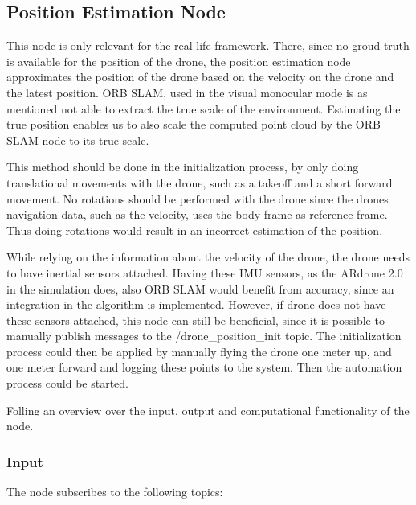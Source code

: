 	
	\subsection{Position Estimation Node}
	
	This node is only relevant for the real life framework. There, since no groud truth is available for the position of the drone, 
	the position estimation node approximates the position of the drone based on the velocity on the drone and the latest position. ORB SLAM, used 
	in the visual monocular mode is as mentioned not able to extract the true scale of the environment. Estimating the true position enables us 
	to also scale the computed point cloud by the ORB SLAM node to its true scale. 
	
	This method should be done in the initialization process, by 
	only doing translational movements with the drone, such as a takeoff and a short forward movement. No rotations should be performed with the drone 
	since the drones navigation data, such as the velocity, uses the body-frame as reference frame. Thus doing rotations would result in an incorrect 
	estimation of the position. 
	
	While relying on the information about the 
	velocity of the drone, the drone needs to have inertial sensors attached. Having these IMU sensors, as the ARdrone 2.0 in the simulation does,
	also ORB SLAM would benefit from 
	accuracy, since an integration in the algorithm is implemented. However, if drone does not have these sensors attached, 
	this node can still be beneficial, since it is possible to manually publish messages to the /drone\_position\_init topic. 
	The initialization process could then be applied 
	by manually flying the drone one meter up, and one meter forward and logging these points to the system. Then the automation process could be started.
	
	
	Folling an overview over the input, output and computational functionality of the node. 
	
	\subsubsection{Input}
	
	The node subscribes to the following topics:
	
